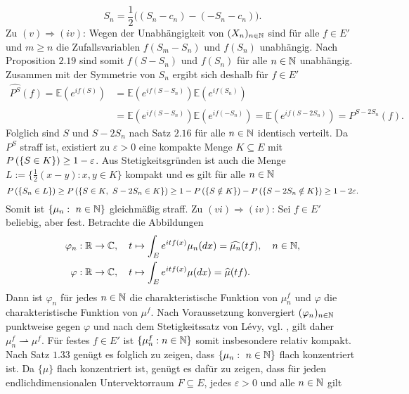 \begin{proof*}
    $$
       S_n =  \frac{1}{2}\big((S_n - c_n) - (-S_n -c_n)\big). 
    $$
    Zu $(v) \Rightarrow (iv)$: Wegen der Unabhängigkeit von $(X_n)_{n \in \mathbb{N}}$ sind für alle $f \in E'$ und $m \geq n$ die Zufallsvariablen $f(S_m - S_n)$ und $f(S_n)$ unabhängig. 
    Nach Proposition $2.19$ sind somit $f(S-S_n)$ und $f(S_n)$ für alle $n \in \mathbb{N}$ unabhängig. Zusammen mit der Symmetrie von $S_n$ ergibt sich deshalb für $f \in E'$
    \begin{align*}
        \widehat{P^S}(f) = \mathbb{E}(e^{if(S)}) &= \mathbb{E}(e^{if(S-S_n)})\mathbb{E}(e^{if(S_n)})  \\\
                                        &= \mathbb{E}(e^{if(S-S_n)})\mathbb{E}(e^{if(-S_n)}) = \mathbb{E}(e^{if(S-2S_n)}) = \widehat{P^{S-2S_n}}(f).
    \end{align*}
    Folglich sind $S$ und $S - 2S_n$ nach Satz $2.16$ für alle $n \in \mathbb{N}$  identisch verteilt. Da $P^S$ straff ist, existiert zu $\varepsilon >0$ eine kompakte Menge $K \subseteq E$ mit $P\left(\left\{ S \in K \right\}\right) \geq 1 - \varepsilon$. 
    Aus Stetigkeitsgründen ist auch die Menge $L := \{\frac{1}{2}(x-y): x,y \in K\}$ kompakt und es gilt für alle $n \in \mathbb{N}$
    $$
        \prob{S_n \in L} \geq \prob{S \in K, \ S-2S_n \in K} \geq 1 - \prob{S \notin K} - \prob{S-2S_n \notin K} \geq 1 - 2\varepsilon. 
    $$ 
    Somit ist $\{\mu_n : \ n \in \mathbb{N}\}$ gleichmäßig straff. 
    \newline
    Zu $(vi) \Rightarrow (iv)$: 
    Sei $f \in E'$ beliebig, aber fest. Betrachte die Abbildungen 
    \begin{align*}
        \varphi_n &: \mathbb{R} \to \mathbb{C}, \quad t \mapsto \int_E e^{itf(x)}\mu_n(dx) = \widehat{\mu_n}(tf), \quad n \in \mathbb{N}, \\\
        \varphi   &: \mathbb{R} \to \mathbb{C}, \quad t \mapsto \int_E e^{itf(x)}\mu(dx) = \widehat{\mu}(tf). 
    \end{align*}
    Dann ist  $\varphi_n$ für jedes $n \in \mathbb{N}$ die charakteristische Funktion von $\mu_n^{f}$ und $\varphi$ die charakteristische Funktion von $\mu^f$. Nach Voraussetzung konvergiert $(\varphi_n)_{n \in \mathbb{N}}$ punktweise gegen $\varphi$ und nach 
    dem Stetigkeitssatz von Lévy, vgl. \cite[Satz 8.7.5]{gs}, gilt daher $\mu_n^f \rightharpoonup \mu^f$. Für festes $f \in E'$ ist \mbox{$\{\mu_n^f : n \in \mathbb{N}\}$} somit insbesondere relativ kompakt.
     Nach Satz $1.33$ genügt es folglich zu zeigen, dass $\{\mu_n : \ n \in \mathbb{N}\}$ flach konzentriert ist. 
    Da $\{\mu\}$ flach konzentriert ist, genügt es dafür zu zeigen, dass für jeden endlichdimensionalen Untervektorraum $F \subseteq E$, jedes $\varepsilon > 0$ und alle $n \in \mathbb{N}$ gilt 

\end{proof*}
